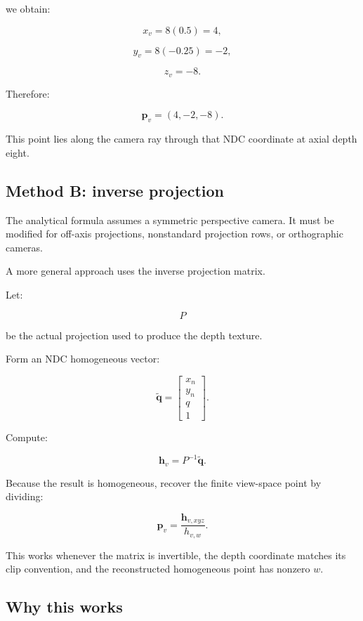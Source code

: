 we obtain:

\[ x_v=8(0.5)=4, \]

\[ y_v=8(-0.25)=-2, \]

\[ z_v=-8. \]

Therefore:

\[ \boxed{\mathbf p_v=(4,-2,-8)}. \]

This point lies along the camera ray through that NDC coordinate at axial depth eight.

\subsection{Method B: inverse projection}\label{02-foundations-ii-ch035-method-b-inverse-projection}

\hypertarget{02-foundations-ii-ch035-method-b-inverse-projection}{}

The analytical formula assumes a symmetric perspective camera. It must be modified for off-axis projections, nonstandard projection rows, or orthographic cameras.

A more general approach uses the inverse projection matrix.

Let:

\[ P \]

be the actual projection used to produce the depth texture.

Form an NDC homogeneous vector:

\[ \tilde{\mathbf q}= \begin{bmatrix} x_n\\y_n\\q\\1 \end{bmatrix}. \]

Compute:

\[ \boxed{ \mathbf h_v=P^{-1}\tilde{\mathbf q}. } \]

Because the result is homogeneous, recover the finite view-space point by dividing:

\[ \boxed{ \mathbf p_v=\frac{\mathbf h_{v,xyz}}{h_{v,w}}. } \]

This works whenever the matrix is invertible, the depth coordinate matches its clip convention, and the reconstructed homogeneous point has nonzero \(w\).

\subsection{Why this works}\label{02-foundations-ii-ch035-why-this-works}

